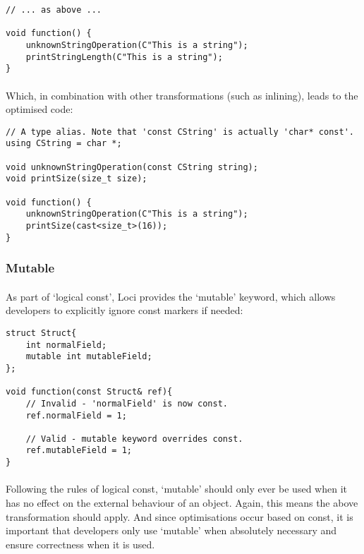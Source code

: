 \documentclass[12pt,twoside,notitlepage]{report}
\begin{document}
\begin{lstlisting}
// ... as above ...

void function() {
	unknownStringOperation(C"This is a string");
	printStringLength(C"This is a string");
}
\end{lstlisting}

\paragraph{}
Which, in combination with other transformations (such as inlining), leads to the optimised code:

\begin{lstlisting}
// A type alias. Note that 'const CString' is actually 'char* const'.
using CString = char *;

void unknownStringOperation(const CString string);
void printSize(size_t size);

void function() {
	unknownStringOperation(C"This is a string");
	printSize(cast<size_t>(16));
}
\end{lstlisting}

\subsubsection{Mutable}

\paragraph{}
As part of `logical const', Loci provides the `mutable' keyword, which allows developers to explicitly ignore const markers if needed:

\begin{lstlisting}
struct Struct{
	int normalField;
	mutable int mutableField;
};

void function(const Struct& ref){
	// Invalid - 'normalField' is now const.
	ref.normalField = 1;
	
	// Valid - mutable keyword overrides const.
	ref.mutableField = 1;
}
\end{lstlisting}

\paragraph{}
Following the rules of logical const, `mutable' should only ever be used when it has no effect on the external behaviour of an object. Again, this means the above transformation should apply. And since optimisations occur based on const, it is important that developers only use `mutable' when absolutely necessary and ensure correctness when it is used.
\end{document}

